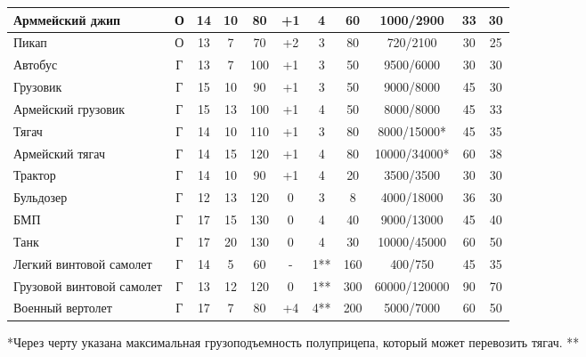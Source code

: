 \begin{center}
\begin{longtable}{|p{2.5cm}||c|c|c|c||c|c|c||c|c|c|}
Арммейский джип & 
О & 14 & 10 & 80 & 
+1 & 4 & 60 & 
1000/2900 & 33 & 30 \\ \hline

Пикап & 
О & 13 & 7 & 70 & 
+2 & 3 & 80 & 
720/2100 & 30 & 25 \\ \hline

Автобус & 
Г & 13 & 7 & 100 & 
+1 & 3 & 50 & 
9500/6000 & 30 & 30 \\ \hline

Грузовик & 
Г & 15 & 10 & 90 & 
+1 & 3 & 50 & 
9000/8000 & 45 & 30 \\ \hline

Армейский грузовик & 
Г & 15 & 13 & 100 & 
+1 & 4 & 50 & 
8000/8000 & 45 & 33 \\ \hline

Тягач & 
Г & 14 & 10 & 110 & 
+1 & 3 & 80 & 
8000/15000* & 45 & 35 \\ \hline

Армейский тягач & 
Г & 14 & 15 & 120 & 
+1 & 4 & 80 & 
10000/34000* & 60 & 38 \\ \hline

Трактор & 
Г & 14 & 10 & 90 & 
+1 & 4 & 20 & 
3500/3500 & 30 & 30 \\ \hline

Бульдозер & 
Г & 12 & 13 & 120 & 
0 & 3 & 8 & 
4000/18000 & 36 & 30 \\ \hline

БМП & 
Г & 17 & 15 & 130 & 
0 & 4 & 40 & 
9000/13000 & 45 & 40 \\ \hline

Танк & 
Г & 17 & 20 & 130 & 
0 & 4 & 30 & 
10000/45000 & 60 & 50 \\ \hline

Легкий винтовой самолет & 
Г & 14 & 5 & 60 & 
- & 1** & 160 & 
400/750 & 45 & 35 \\ \hline

Грузовой винтовой самолет & 
Г & 13 & 12 & 120 & 
0 & 1** & 300 & 
60000/120000 & 90 & 70 \\ \hline

Военный вертолет & 
Г & 17 & 7 & 80 & 
+4 & 4** & 200 & 
5000/7000 & 60 & 50 \\ \hline

\end{longtable}
\end{center}




*Через черту указана максимальная грузоподъемность полуприцепа, который может перевозить тягач.
**